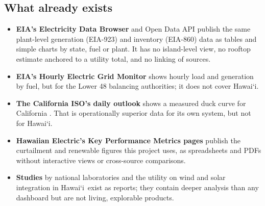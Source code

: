 \documentclass[11pt,a4paper]{article}
\newcommand{\okina}{\textquoteleft}
\newcommand{\Hawaii}{\texorpdfstring{Hawai\okina i}{Hawaii}}
\begin{document}
\subsection{What already exists}
\begin{itemize}
\item \textbf{EIA's Electricity Data Browser} and Open Data API publish the same plant-level generation
 (EIA-923) and inventory (EIA-860) data as tables and simple charts by state, fuel or plant. It has no
 island-level view, no rooftop estimate anchored to a utility total, and no linking of sources.
\item \textbf{EIA's Hourly Electric Grid Monitor} \cite{gridmonitor} shows hourly load and generation by fuel, but
 for the Lower 48 balancing authorities; it does not cover \Hawaii.
\item \textbf{The California ISO's daily outlook} shows a measured duck curve for California \cite{caiso}. That is
 operationally superior data for its own system, but not for \Hawaii.
\item \textbf{Hawaiian Electric's Key Performance Metrics pages} \cite{heco-kpm} publish the curtailment and
 renewable figures this project uses, as spreadsheets and PDFs without interactive views or cross-source
 comparisons.
\item \textbf{Studies} by national laboratories and the utility on wind and solar integration in \Hawaii\ exist as
 reports; they contain deeper analysis than any dashboard but are not living, explorable products.
\end{itemize}
\end{document}
